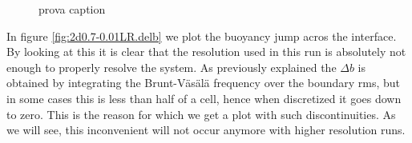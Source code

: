 \begin{figure}[t]
  \centering
      \hfill
      \hfill
      \hfill
	\caption{prova caption}
  \end{figure}
In figure \ref{fig:2d0.7-0.01LR.delb} we plot the buoyancy jump acros the interface. By looking at this it is clear that the resolution used in this run is absolutely not enough to properly resolve the system. As previously explained the $\Delta b$ is obtained by integrating the Brunt-Väsälä frequency over the boundary rms, but in some cases this is less than half of a cell, hence when discretized it goes down to zero. This is the reason for which we get a plot with such discontinuities. As we will see, this inconvenient will not occur anymore with higher resolution runs. \\
